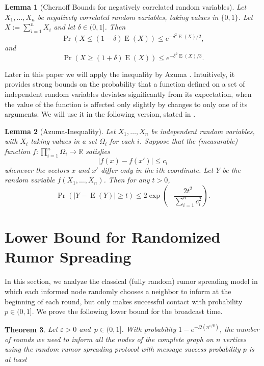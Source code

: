 \documentclass[12pt]{article}
\newtheorem{theorem}{Theorem}
\newtheorem{lemma}[theorem]{Lemma}
\newcommand{\e}{\varepsilon}
\DeclareMathOperator{\E}{E}
\newcommand{\RR}{{\mathbb{R}}}
\begin{document}
{\begin{lemma}[Chernoff Bounds for negatively correlated random variables]
\label{thm:chernoffnc}
Let $X_1, \dots ,X_n$ be negatively correlated random variables, taking
values in $\{0, 1\}$. Let $X := \sum_{i=1}^n X_i$ and let $\delta \in (0,1]$. Then 
$$ \Pr \left(X \leq (1-\delta)\E (X)\right)\leq e^{-\delta^2\E (X)/2},$$
and
$$ \Pr \left(X \geq (1+\delta)\E (X)\right)\leq e^{-\delta^2\E (X)/3}.$$
\end{lemma}

Later in this paper we will apply the inequality by Azuma \cite{Azuma}. Intuitively, it provides strong bounds on the probability that a function defined on a set of independent random variables deviates significantly from its expectation, when the value of the function is affected only slightly by changes to only one of its arguments. 
We will use it in the following version, stated in \cite[Lemma 1.2]{mcdiarmid89}.

\begin{lemma}[Azuma-Inequality]
\label{thm:azuma} Let $X_1, \dots ,X_n$ be independent random variables, with $X_i$ taking
values in a set $\Omega_i$ for each $i$. Suppose that the (measurable) function $f:\prod_{i=1}^n\Omega_i\rightarrow\RR$ satisfies
\begin{equation*}
|f(x) - f(x')| \leq c_i
\end{equation*}
whenever the vectors $x$ and $x'$ differ only in the $i$th coordinate. Let $Y$ be the random variable
$f(X_1, \dots ,X_n)$. Then for any $t > 0$,
\begin{equation*}
 \Pr (|Y - \E(Y)| \geq t) \leq 2 \exp\left(-\frac{2t^2}{\sum_{i=1}^nc_i^2}	\right).
\end{equation*}
\end{lemma}

\section{Lower Bound for Randomized Rumor Spreading}\label{sec:lower}


In this section, we analyze the classical (fully random) rumor spreading model in which each informed node randomly chooses a neighbor to inform at the beginning of each round, but only makes successful contact with probability~$p \in (0,1]$. We prove the following lower bound for the broadcast time.

\begin{theorem}
 Let $\e>0$ and~$p \in (0,1]$. With probability $1-e^{-\Omega(n^{\e/6})}$, the number of rounds we need to inform all the nodes of the complete graph on $n$ vertices using the random rumor spreading protocol with message success probability $p$ is at least


\end{theorem}}
\end{document}
